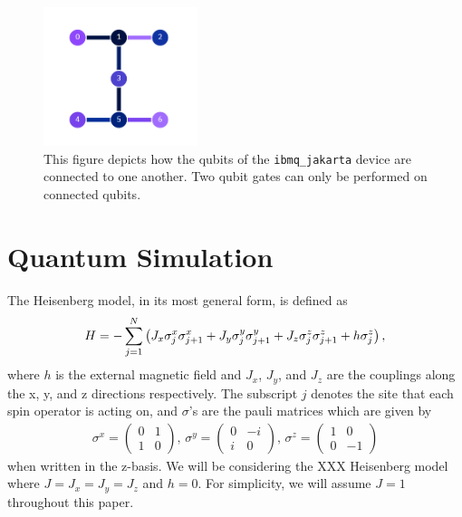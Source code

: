 \documentclass[aps,prl, reprint]{revtex4-2}
\begin{document}
\begin{figure}
\includegraphics[width=0.4\textwidth]{JakartaDiagram.png}
\caption{This figure depicts how the qubits of the \texttt{ibmq\_jakarta} device are connected to one another. Two qubit gates can only be performed on connected qubits.}
\label{fig:JakartaConnect}
\end{figure}

\section{Quantum Simulation}

The Heisenberg model, in its most general form, is defined as
\begin{dmath}
H =- \sum_{j=1}^{N}\left(J_{x} \sigma_{j}^{x} \sigma_{j+1}^{x}+J_{y} \sigma_{j}^{y} \sigma_{j+1}^{y}\\
+J_{z} \sigma_{j}^{z} \sigma_{j+1}^{z}+h \sigma_{j}^{z}\right),
\end{dmath}
where $h$ is the external magnetic field and $J_x$, $J_y$, and $J_z$ are the couplings along the x, y, and z directions respectively. The subscript $j$ denotes the site that each spin operator is acting on, and $\sigma$'s are the pauli matrices which are given by 
\begin{equation}
\begin{array}{c}
\sigma^{x}=\left(\begin{array}{cc}
0 & 1 \\
1 & 0
\end{array}\right), \,
\sigma^{y}=\left(\begin{array}{cc}
0 & -i \\
i & 0
\end{array}\right),\,
\sigma^{z}=\left(\begin{array}{cc}
1 & 0 \\
0 & -1
\end{array}\right)
\end{array}
\end{equation}
when written in the z-basis. We will be considering the XXX Heisenberg model where $J = J_x = J_y = J_z$ and $h =0$. For simplicity, we will assume $J=1$ throughout this paper.  
\end{document}
